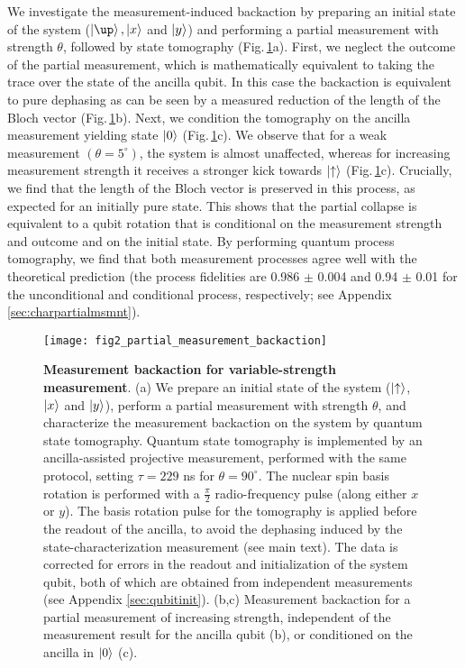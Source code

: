 We investigate the measurement-induced backaction by preparing an initial state of the system ($\ket{\up},\ket{x}$ and $\left|y\right>$) and performing a partial measurement with strength $\theta$, followed by state tomography (Fig.\,\ref{fig:amc-fig2}a). First, we neglect the outcome of the partial measurement, which is mathematically equivalent to taking the trace over the state of the ancilla qubit. In this case the backaction is equivalent to pure dephasing as can be seen by a measured reduction of the length of the Bloch vector (Fig.\,\ref{fig:amc-fig2}b). Next, we condition the tomography on the ancilla measurement yielding state $\left|0\right>$ (Fig.\,\ref{fig:amc-fig2}c). We observe that for a weak measurement $(\theta = 5^{\circ})$, the system is almost unaffected, whereas for increasing measurement strength it receives a stronger kick towards $\left|\uparrow\right>$ (Fig.\,\ref{fig:amc-fig2}c). Crucially, we find that the length of the Bloch vector is preserved in this process, as expected for an initially pure state. This shows that the partial collapse is equivalent to a qubit rotation that is conditional on the measurement strength and outcome and on the initial state. By performing quantum process tomography, we find that both measurement processes agree well with the theoretical prediction (the process fidelities are 0.986 $\pm$ 0.004 and 0.94 $\pm$ 0.01 for the unconditional and conditional process, respectively; see Appendix \ref{sec:charpartialmsmnt}).


\begin{figure}
	\centering
	\texttt{[image: fig2\_partial\_measurement\_backaction]}
	\caption{\label{fig:amc-fig2} \textbf{Measurement backaction for variable-strength measurement}. (a) We prepare an initial state  of the system ($\left|\uparrow\right>$,  $\left|x\right>$ and  $\left|y\right>$), perform a partial measurement with strength $\theta$, and characterize the measurement backaction on the system by quantum state tomography. Quantum state tomography is implemented by an ancilla-assisted projective measurement, performed with the same protocol, setting $\tau = 229$ ns for $\theta = 90^{\circ}$. The nuclear spin basis rotation is performed with a $\frac{\pi}{2}$ radio-frequency pulse (along either $x$ or $y$). The basis rotation pulse for the tomography is applied before the readout of the ancilla, to avoid the dephasing induced by the state-characterization measurement (see main text). The data is corrected for errors in the readout and initialization of the system qubit, both of which are obtained from independent measurements (see Appendix \ref{sec:qubitinit}). (b,c)  Measurement backaction for a partial measurement of increasing strength, independent of the measurement result for the ancilla qubit (b), or conditioned on the ancilla in  $\left|0\right>$ (c). }
\end{figure}

